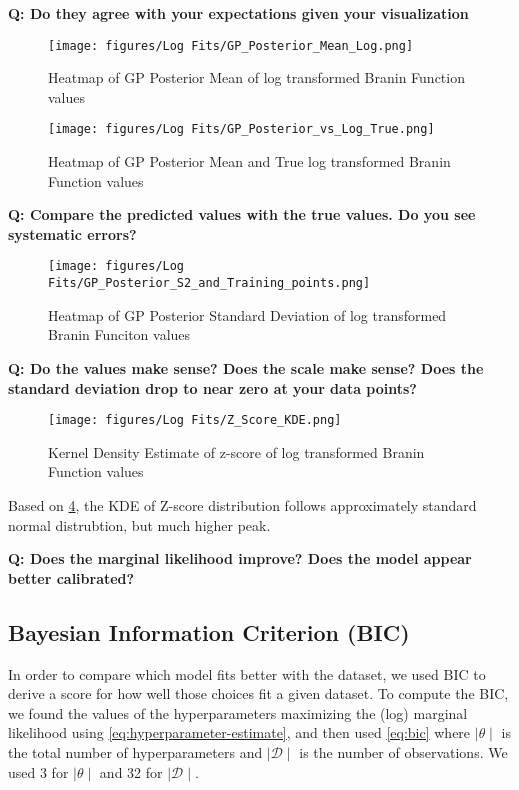 \documentclass[11pt]{article}
\newcommand{\mc}[1]{\mathcal{#1}}
\newcommand{\data}{\mc{D}}
\numberwithin{equation}{section}
\begin{document}
\textbf{Q: Do they agree with your expectations given your visualization}

\begin{figure}[H]
  \centering
  \texttt{[image: figures/Log Fits/GP\_Posterior\_Mean\_Log.png]}
  \caption{Heatmap of GP Posterior Mean of log transformed Branin Function values}
  \label{fig:gp_post_mean_log}
\end{figure}

\begin{figure}[H]
  \centering
  \texttt{[image: figures/Log Fits/GP\_Posterior\_vs\_Log\_True.png]}
  \caption{Heatmap of GP Posterior Mean and True log transformed Branin Function values}
  \label{fig:gp_post_mean_true_log}
\end{figure}
\textbf{Q: Compare the predicted values with the true values. Do you see systematic errors?}

\begin{figure}[H]
  \centering
  \texttt{[image: figures/Log Fits/GP\_Posterior\_S2\_and\_Training\_points.png]}
  \caption{Heatmap of GP Posterior Standard Deviation of log transformed Branin Funciton values}
  \label{fig:gp_post_std_log}
\end{figure}

\textbf{Q: Do the values make sense? Does the scale make sense? Does the standard deviation drop to near zero at your data points?}

\begin{figure}[H]
  \centering
  \texttt{[image: figures/Log Fits/Z\_Score\_KDE.png]}
  \caption{Kernel Density Estimate of z-score of log transformed Branin Function values}
  \label{fig:zscore_kde_log}
\end{figure}
Based on \ref{fig:zscore_kde_log}, the KDE of Z-score distribution follows approximately standard normal distrubtion, but much higher peak.

\textbf{Q: Does the marginal likelihood improve? Does the model appear better calibrated?}

\subsection*{Bayesian Information Criterion (BIC)}
In order to compare which model fits better with the dataset, we used BIC to derive a score for how well those choices fit a given dataset. To compute the BIC, we found the values of the hyperparameters maximizing the (log) marginal likelihood using \ref{eq:hyperparameter-estimate}, and then used \ref{eq:bic} where $\mid \theta \mid$ is the total number of hyperparameters and $\mid \data \mid$ is the number of observations. We used 3 for $\mid \theta \mid$ and 32 for $\mid \data \mid$. 
\end{document}
